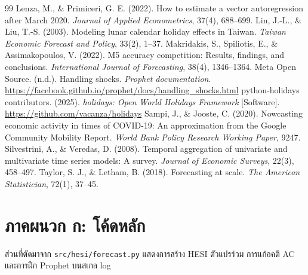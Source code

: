 \documentclass{article}
\theoremstyle{definition}
\begin{document}
\begin{thebibliography}{99}
 Lenza, M., \& Primiceri, G. E. (2022). How to estimate a vector autoregression after March 2020. \emph{Journal of Applied Econometrics}, 37(4), 688--699.
 Lin, J.-L., \& Liu, T.-S. (2003). Modeling lunar calendar holiday effects in Taiwan. \emph{Taiwan Economic Forecast and Policy}, 33(2), 1--37.
 Makridakis, S., Spiliotis, E., \& Assimakopoulos, V. (2022). M5 accuracy competition: Results, findings, and conclusions. \emph{International Journal of Forecasting}, 38(4), 1346--1364.
 Meta Open Source. (n.d.). Handling shocks. \emph{Prophet documentation}. \url{https://facebook.github.io/prophet/docs/handling_shocks.html}
 python-holidays contributors. (2025). \emph{holidays: Open World Holidays Framework} [Software]. \url{https://github.com/vacanza/holidays}
 Sampi, J., \& Jooste, C. (2020). Nowcasting economic activity in times of COVID-19: An approximation from the Google Community Mobility Report. \emph{World Bank Policy Research Working Paper}, 9247.
 Silvestrini, A., \& Veredas, D. (2008). Temporal aggregation of univariate and multivariate time series models: A survey. \emph{Journal of Economic Surveys}, 22(3), 458--497.
 Taylor, S. J., \& Letham, B. (2018). Forecasting at scale. \emph{The American Statistician}, 72(1), 37--45.
\end{thebibliography}

\appendix
\section*{ภาคผนวก ก: โค้ดหลัก}
ส่วนที่ตัดมาจาก \texttt{src/hesi/forecast.py} แสดงการสร้าง HESI ตัวแปรร่วม การแก้อคติ AC และการฝึก Prophet บนสเกล log
\end{document}
